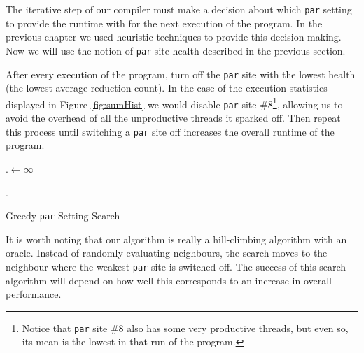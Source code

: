 The iterative step of our compiler must make a decision about which \verb|par|
setting to provide the runtime with for the next execution of the program. In
the previous chapter we used heuristic techniques to provide this decision
making. Now we will use the notion of \verb|par| site health described in the
previous section.

After every execution of the program, turn off the \verb'par' site with the
lowest health (the lowest average reduction count). In the case of the
execution statistics displayed in Figure \ref{fig:sumHist} we would disable
\verb-par- site \#8\footnote{Notice that \texttt{par} site \#8 also has some
very productive threads, but even so, its mean is the lowest in that run of the
program.}, allowing us to avoid the overhead of all the unproductive threads it
sparked off.  Then repeat this process until switching a \verb'par' site off
increases the overall runtime of the program.


\begin{algorithm}
\DontPrintSemicolon
{}

\BlankLine

\Last.\Run $\leftarrow \infty$\;
\BlankLine

\BlankLine
\Return \Last.\Setting\;
\caption{Greedy \texttt{par}-Setting Search}
\label{list:greedy}
\end{algorithm}

It is worth noting that our algorithm is really a hill-climbing algorithm with
an oracle. Instead of randomly evaluating neighbours, the search moves to the
neighbour where the weakest \verb|par| site is switched off. The success of this
search algorithm will depend on how well this corresponds to an increase in
overall performance.

